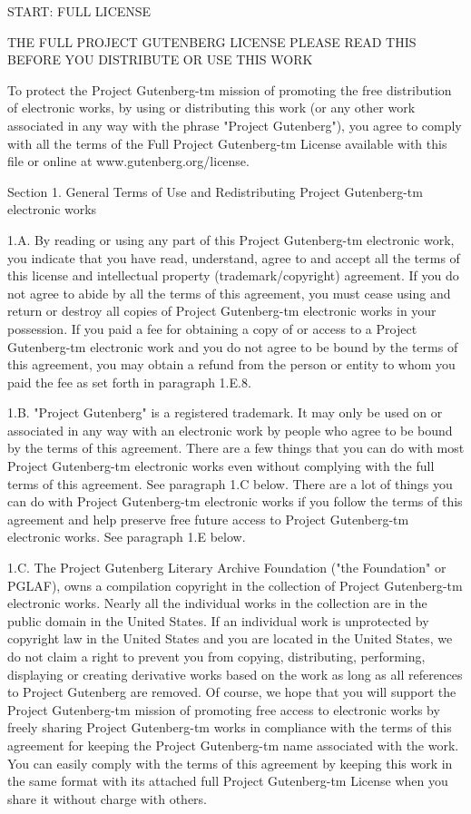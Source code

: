 START: FULL LICENSE

THE FULL PROJECT GUTENBERG LICENSE
PLEASE READ THIS BEFORE YOU DISTRIBUTE OR USE THIS WORK

To protect the Project Gutenberg-tm mission of promoting the free
distribution of electronic works, by using or distributing this work
(or any other work associated in any way with the phrase "Project
Gutenberg"), you agree to comply with all the terms of the Full
Project Gutenberg-tm License available with this file or online at
www.gutenberg.org/license.

Section 1. General Terms of Use and Redistributing Project
Gutenberg-tm electronic works

1.A. By reading or using any part of this Project Gutenberg-tm
electronic work, you indicate that you have read, understand, agree to
and accept all the terms of this license and intellectual property
(trademark/copyright) agreement. If you do not agree to abide by all
the terms of this agreement, you must cease using and return or
destroy all copies of Project Gutenberg-tm electronic works in your
possession. If you paid a fee for obtaining a copy of or access to a
Project Gutenberg-tm electronic work and you do not agree to be bound
by the terms of this agreement, you may obtain a refund from the
person or entity to whom you paid the fee as set forth in paragraph
1.E.8.

1.B. "Project Gutenberg" is a registered trademark. It may only be
used on or associated in any way with an electronic work by people who
agree to be bound by the terms of this agreement. There are a few
things that you can do with most Project Gutenberg-tm electronic works
even without complying with the full terms of this agreement. See
paragraph 1.C below. There are a lot of things you can do with Project
Gutenberg-tm electronic works if you follow the terms of this
agreement and help preserve free future access to Project Gutenberg-tm
electronic works. See paragraph 1.E below.

1.C. The Project Gutenberg Literary Archive Foundation ("the
Foundation" or PGLAF), owns a compilation copyright in the collection
of Project Gutenberg-tm electronic works. Nearly all the individual
works in the collection are in the public domain in the United
States. If an individual work is unprotected by copyright law in the
United States and you are located in the United States, we do not
claim a right to prevent you from copying, distributing, performing,
displaying or creating derivative works based on the work as long as
all references to Project Gutenberg are removed. Of course, we hope
that you will support the Project Gutenberg-tm mission of promoting
free access to electronic works by freely sharing Project Gutenberg-tm
works in compliance with the terms of this agreement for keeping the
Project Gutenberg-tm name associated with the work. You can easily
comply with the terms of this agreement by keeping this work in the
same format with its attached full Project Gutenberg-tm License when
you share it without charge with others.

